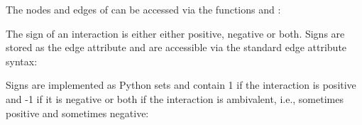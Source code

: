 \documentclass[letterpaper,10pt,english]{sphinxmanual}
\begin{document}
The nodes and edges of  can be accessed via the {\hyperref[\detokenize{Installation:installation-networkx}]{}} functions  and :

\begin{sphinxVerbatim}[commandchars=\\\{\}]
\end{sphinxVerbatim}

The sign of an interaction is either either positive, negative or both.
Signs are stored as the edge attribute  and are accessible via the standard {\hyperref[\detokenize{Installation:installation-networkx}]{}} edge attribute syntax:

\begin{sphinxVerbatim}[commandchars=\\\{\}]
\PYG{p}{[}\PYG{p}{]}\PYG{p}{[}\PYG{p}{]}\PYG{p}{[}\PYG{p}{]}
\end{sphinxVerbatim}

Signs are implemented as Python sets and contain 1 if the interaction is positive and -1 if it is negative or both if the interaction is ambivalent,
i.e., sometimes positive and sometimes negative:

\begin{sphinxVerbatim}[commandchars=\\\{\}]
\PYG{p}{[}\PYG{p}{]}\PYG{p}{[}\PYG{p}{]}\PYG{p}{[}\PYG{p}{]}
\end{sphinxVerbatim}
\end{document}
